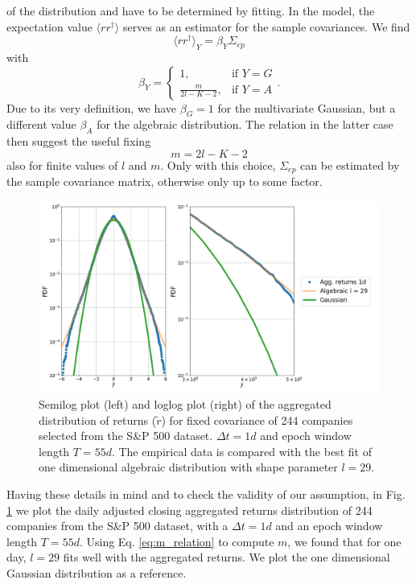 of the distribution and have to be determined by fitting. In the model, the
expectation value $\langle r r^{\dagger} \rangle$ serves as an estimator for
the sample covariances. We find
\begin{equation}
    \langle r r^{\dagger} \rangle_{Y} = \beta_{Y} \Sigma_{ep}
\end{equation}
with
\begin{equation}
    \beta_{Y}=\begin{cases}
    1, & \text{if }Y=G\\
    \frac{m}{2l-K-2}, & \text{if }Y=A
\end{cases}.
\end{equation}
Due to its very definition, we have $\beta_{G} = 1$ for the multivariate
Gaussian, but a different value $\beta_{A}$ for the algebraic distribution. The
relation in the latter case then suggest the useful fixing
\begin{equation}\label{eq:m_relation}
    m = 2l - K - 2
\end{equation}
also for finite values of $l$ and $m$. Only with this choice, $\Sigma_{ep}$ can
be estimated by the sample covariance matrix, otherwise only up to some factor.

\begin{figure}[htbp]
    \centering
    \includegraphics[width=0.7\columnwidth]
    {figures/05_algebraic_agg_returns_short_epoch.png}
    \caption{Semilog plot (left) and loglog plot (right) of the aggregated
             distribution of returns ($\tilde{r}$) for fixed covariance of 244
             companies selected from the S\&P 500 dataset. $\Delta t = 1d$ and
             epoch window length $T=55d$. The empirical data is compared with
             the best fit of one dimensional algebraic distribution with shape
             parameter $l=29$.}
    \label{fig:algebraic_agg_returns_epoch}
\end{figure}

Having these details in mind and to check the validity of our assumption, in
Fig. \ref{fig:algebraic_agg_returns_epoch} we plot the daily adjusted closing
aggregated returns distribution of 244 companies from the S\&P 500 dataset,
with a $\Delta t = 1d$ and an epoch window length $T = 55d$. Using Eq.
\ref{eq:m_relation} to compute $m$, we found that for one day, $l = 29$ fits
well with the aggregated returns. We plot the one dimensional Gaussian
distribution as a reference.

